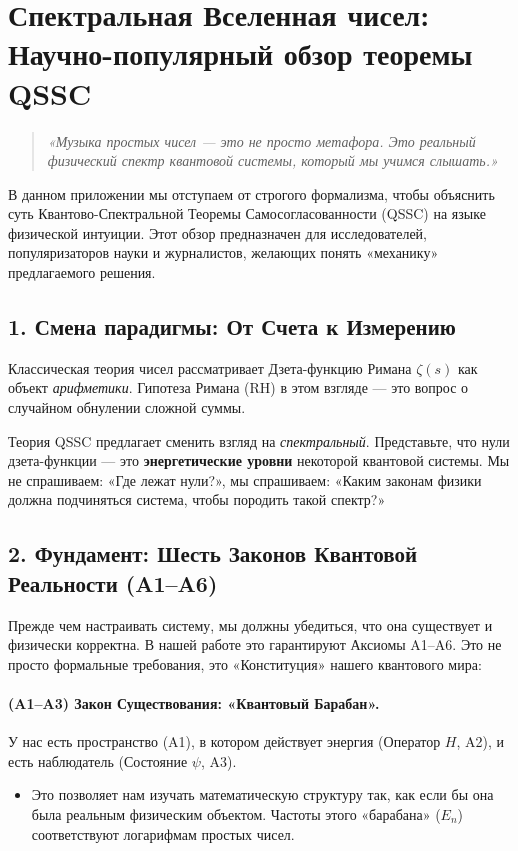 \documentclass{article}
\numberwithin{equation}{section}
\theoremstyle{plain}
\theoremstyle{definition}
\theoremstyle{remark}
\begin{document}
\clearpage

\section{Спектральная Вселенная чисел: Научно-популярный обзор теоремы QSSC}
\label{sec:pop-science}

\begin{quote}
\textit{«Музыка простых чисел — это не просто метафора. Это реальный физический спектр квантовой системы, который мы учимся слышать.»}
\end{quote}

В данном приложении мы отступаем от строгого формализма, чтобы объяснить суть Квантово-Спектральной Теоремы Самосогласованности (QSSC) на языке физической интуиции. Этот обзор предназначен для исследователей, популяризаторов науки и журналистов, желающих понять «механику» предлагаемого решения.

\subsection*{1. Смена парадигмы: От Счета к Измерению}

Классическая теория чисел рассматривает Дзета-функцию Римана $\zeta(s)$ как объект \emph{арифметики}. Гипотеза Римана (RH) в этом взгляде — это вопрос о случайном обнулении сложной суммы.

Теория QSSC предлагает сменить взгляд на \emph{спектральный}. Представьте, что нули дзета-функции — это \textbf{энергетические уровни} некоторой квантовой системы. Мы не спрашиваем: «Где лежат нули?», мы спрашиваем: «Каким законам физики должна подчиняться система, чтобы породить такой спектр?»

\subsection*{2. Фундамент: Шесть Законов Квантовой Реальности (A1–A6)}

Прежде чем настраивать систему, мы должны убедиться, что она существует и физически корректна. В нашей работе это гарантируют Аксиомы A1–A6. Это не просто формальные требования, это «Конституция» нашего квантового мира:

\paragraph{(A1–A3) Закон Существования: «Квантовый Барабан».}
У нас есть пространство (A1), в котором действует энергия (Оператор $H$, A2), и есть наблюдатель (Состояние $\psi$, A3).
\begin{itemize}
    \item Это позволяет нам изучать математическую структуру так, как если бы она была реальным физическим объектом. Частоты этого «барабана» ($E_n$) соответствуют логарифмам простых чисел.
\end{itemize}
\end{document}
